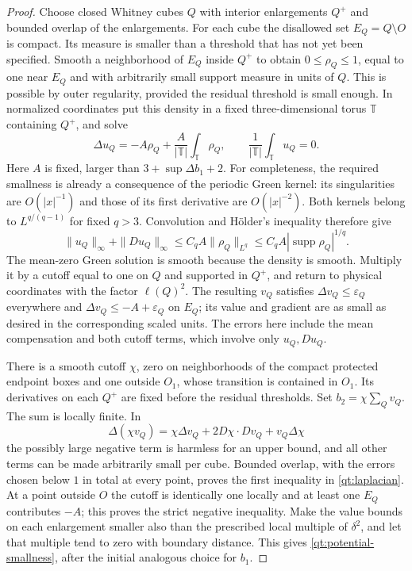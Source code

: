 \documentclass[11pt]{article}
\numberwithin{equation}{section}
\theoremstyle{definition}
\theoremstyle{remark}
\begin{document}
\begin{proof}
Choose closed Whitney cubes $Q$ with interior enlargements $Q^+$ and
bounded overlap of the enlargements.  For each cube the disallowed set
$E_Q=Q\setminus O$ is compact.  Its measure is smaller than a threshold
that has not yet been specified.  Smooth a neighborhood of $E_Q$ inside
$Q^+$ to obtain $0\leq\rho_Q\leq1$, equal to one near $E_Q$ and with
arbitrarily small support measure in units of $Q$.  This is possible by
outer regularity, provided the residual threshold is small enough.
In normalized coordinates put this density in a fixed three-dimensional
torus $\mathbb T$ containing $Q^+$, and solve
\[
 \Delta u_Q=-A\rho_Q+
       \frac{A}{|\mathbb T|}\int_{\mathbb T}\rho_Q,\qquad
 \frac{1}{|\mathbb T|}\int_{\mathbb T}u_Q=0.
\]
Here $A$ is fixed, larger than $3+\sup\Delta b_1+2$.
For completeness, the required smallness is already a consequence of
the periodic Green kernel: its singularities are $O(|x|^{-1})$ and those
of its first derivative are $O(|x|^{-2})$.  Both kernels belong to
$L^{q/(q-1)}$ for fixed $q>3$.  Convolution and H\"older's inequality
therefore give
\[
 \|u_Q\|_\infty+\|Du_Q\|_\infty
 \leq C_q A\|\rho_Q\|_{L^q}
 \leq C_q A|\operatorname{supp}\rho_Q|^{1/q}.
\]
The mean-zero Green solution is smooth because the density is smooth.
Multiply it by a cutoff equal to one on $Q$ and supported in $Q^+$,
and return to physical coordinates with the factor $\ell(Q)^2$.
The resulting $v_Q$ satisfies $\Delta v_Q\leq\varepsilon_Q$
everywhere and $\Delta v_Q\leq-A+\varepsilon_Q$ on $E_Q$;
its value and gradient are as small as desired in the corresponding
scaled units.  The errors here include the mean compensation and both
cutoff terms, which involve only $u_Q,Du_Q$.

There is a smooth cutoff $\chi$, zero on neighborhoods of the compact
protected endpoint boxes and one outside $O_1$, whose transition is
contained in $O_1$.  Its derivatives on each $Q^+$ are fixed before the
residual thresholds.  Set $b_2=\chi\sum_Qv_Q$.  The sum is locally
finite.  In
\[
 \Delta(\chi v_Q)=\chi\Delta v_Q+2D\chi\cdot Dv_Q+v_Q\Delta\chi
\]
the possibly large negative term is harmless for an upper bound, and
all other terms can be made arbitrarily small per cube.  Bounded overlap,
with the errors chosen below $1$ in total at every point, proves the
first inequality in \eqref{qt:laplacian}.  At a point outside $O$ the
cutoff is identically one locally and at least one $E_Q$ contributes
$-A$; this proves the strict negative inequality.  Make the value bounds
on each enlargement smaller also than the prescribed local multiple of
$\delta^2$, and let that multiple tend to zero with boundary distance.
This gives \eqref{qt:potential-smallness}, after the initial analogous
choice for $b_1$.


\end{proof}
\end{document}
